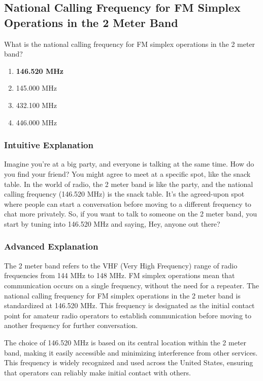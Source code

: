 \subsection{National Calling Frequency for FM Simplex Operations in the 2 Meter Band}
\label{T2A02}

\begin{tcolorbox}[colback=gray!10!white,colframe=black!75!black,title=T2A02]
What is the national calling frequency for FM simplex operations in the 2 meter band?
\begin{enumerate}[label=\Alph*)]
    \item \textbf{146.520 MHz}
    \item 145.000 MHz
    \item 432.100 MHz
    \item 446.000 MHz
\end{enumerate}
\end{tcolorbox}

\subsubsection{Intuitive Explanation}
Imagine you're at a big party, and everyone is talking at the same time. How do you find your friend? You might agree to meet at a specific spot, like the snack table. In the world of radio, the 2 meter band is like the party, and the national calling frequency (146.520 MHz) is the snack table. It's the agreed-upon spot where people can start a conversation before moving to a different frequency to chat more privately. So, if you want to talk to someone on the 2 meter band, you start by tuning into 146.520 MHz and saying, Hey, anyone out there?

\subsubsection{Advanced Explanation}
The 2 meter band refers to the VHF (Very High Frequency) range of radio frequencies from 144 MHz to 148 MHz. FM simplex operations mean that communication occurs on a single frequency, without the need for a repeater. The national calling frequency for FM simplex operations in the 2 meter band is standardized at 146.520 MHz. This frequency is designated as the initial contact point for amateur radio operators to establish communication before moving to another frequency for further conversation.

The choice of 146.520 MHz is based on its central location within the 2 meter band, making it easily accessible and minimizing interference from other services. This frequency is widely recognized and used across the United States, ensuring that operators can reliably make initial contact with others.

